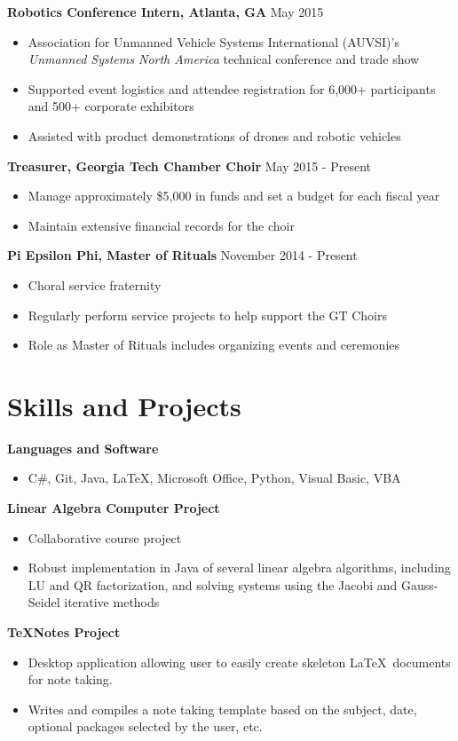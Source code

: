 \documentclass[11pt]{article}
\begin{document}
\textbf{Robotics Conference Intern, Atlanta, GA} \hfill May 2015
\begin{itemize}
\setlength\itemsep{0.5pt}
    \item Association for Unmanned Vehicle Systems International (AUVSI)'s \emph{Unmanned Systems North America} technical conference and trade show
    \item Supported event logistics and attendee registration for 6,000+ participants and 500+ corporate exhibitors
    \item Assisted with product demonstrations of drones and robotic vehicles
\end{itemize}

\textbf{Treasurer, Georgia Tech Chamber Choir} \hfill May 2015 - Present
\begin{itemize}
\setlength\itemsep{0.5pt}
    \item Manage approximately \$5,000 in funds and set a budget for each fiscal year
    \item Maintain extensive financial records for the choir
\end{itemize}

\textbf{Pi Epsilon Phi, Master of Rituals} \hfill November 2014 - Present
\begin{itemize}
\setlength\itemsep{0.5pt}
    \item Choral service fraternity
    \item Regularly perform service projects to help support the GT Choirs
    \item Role as Master of Rituals includes organizing events and ceremonies
\end{itemize}

\section*{Skills and Projects}
\textbf{Languages and Software}
\begin{itemize}
\setlength\itemsep{0.5pt}
    \item C\#, Git, Java, \LaTeX, Microsoft Office, Python, Visual Basic, VBA
\end{itemize}

\textbf{Linear Algebra Computer Project}
\begin{itemize}
\setlength\itemsep{0.5pt}
    \item Collaborative course project
    \item Robust implementation in Java of several linear algebra algorithms, including LU and QR factorization, and solving systems using the Jacobi and Gauss-Seidel iterative methods
\end{itemize}

\textbf{TeXNotes Project}
\begin{itemize}
\setlength\itemsep{0.5pt}
    \item Desktop application allowing user to easily create skeleton \LaTeX\ documents for note taking.
    \item Writes and compiles a note taking template based on the subject, date, optional packages selected by the user, etc. 
\end{itemize}
\end{document}
